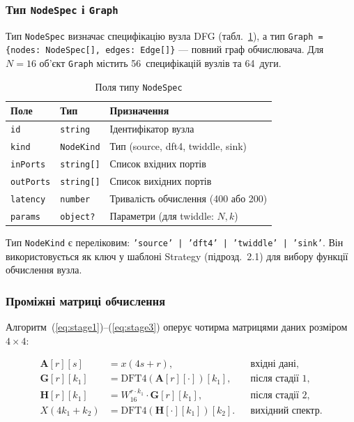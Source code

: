 \subsubsection*{Тип \texttt{NodeSpec} і \texttt{Graph}}

Тип \texttt{NodeSpec} визначає специфікацію вузла DFG
(табл.~\ref{tab:nodespec}), а тип \texttt{Graph = \{nodes:
NodeSpec[], edges: Edge[]\}} --- повний граф обчислювача. Для
$N = 16$ об'єкт \texttt{Graph} містить 56~специфікацій вузлів та
64~дуги.

\begin{table}[H]
  \caption{Поля типу \texttt{NodeSpec}}
  \label{tab:nodespec}
  \centering
  \small
  \begin{tabular}{lll}
    \toprule
    Поле & Тип & Призначення \\
    \midrule
    \texttt{id}       & \texttt{string}    & Ідентифікатор вузла \\
    \texttt{kind}     & \texttt{NodeKind}  & Тип (source, dft4, twiddle, sink) \\
    \texttt{inPorts}  & \texttt{string[]}  & Список вхідних портів \\
    \texttt{outPorts} & \texttt{string[]}  & Список вихідних портів \\
    \texttt{latency}  & \texttt{number}    & Тривалість обчислення (400 або 200) \\
    \texttt{params}   & \texttt{object?}   & Параметри (для twiddle: $N, k$) \\
    \bottomrule
  \end{tabular}
\end{table}

Тип \texttt{NodeKind} є переліковим: \texttt{'source' | 'dft4' |
'twiddle' | 'sink'}. Він використовується як ключ у шаблоні
Strategy (підрозд.~2.1) для вибору функції обчислення вузла.

\subsubsection*{Проміжні матриці обчислення}

Алгоритм~(\ref{eq:stage1})--(\ref{eq:stage3}) оперує чотирма
матрицями даних розміром $4 \times 4$:

\begin{align}
  \mathbf{A}[r][s]   &= x(4s + r),            && \text{вхідні дані,}  \label{eq:A_def} \\
  \mathbf{G}[r][k_1] &= \mathrm{DFT4}(\mathbf{A}[r][\cdot])[k_1],
                     && \text{після стадії 1,}  \label{eq:G_def} \\
  \mathbf{H}[r][k_1] &= W_{16}^{r \cdot k_1} \cdot \mathbf{G}[r][k_1],
                     && \text{після стадії 2,}  \label{eq:H_def} \\
  X(4k_1 + k_2)      &= \mathrm{DFT4}(\mathbf{H}[\cdot][k_1])[k_2].
                     && \text{вихідний спектр.} \label{eq:X_def}
\end{align}

